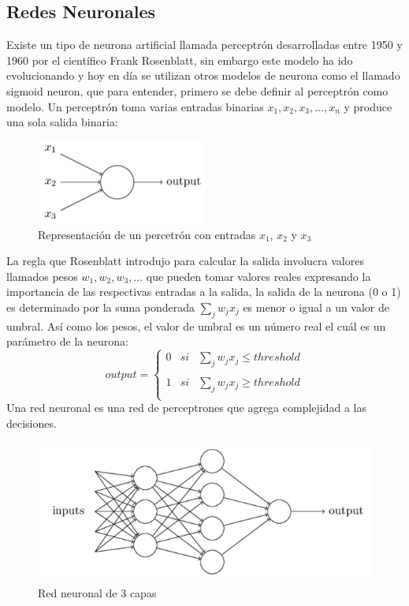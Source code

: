 \subsection{Redes Neuronales}
    Existe un tipo de neurona artificial llamada perceptrón desarrolladas entre 1950 y 1960 por el científico Frank Rosenblatt, sin embargo este modelo ha ido evolucionando y hoy en día se utilizan otros modelos de neurona como el llamado sigmoid neuron, que para entender, primero se debe definir al perceptrón como modelo.
    Un perceptrón toma varias entradas binarias $x_{1},x_{2},x_{3},...,x_{n}$ y produce una sola salida binaria:
     \begin{figure}[H]
        \centering
        \includegraphics[width=0.5\textwidth]{capitulo2/images/perceptron.PNG}
        \caption{Representación de un percetrón con entradas $x_{1}$, $x_{2}$ y $x_{3}$}
        \label{fig:perceptron}
    \end{figure}
    La regla que Rosenblatt introdujo para calcular la salida involucra valores llamados pesos $w_{1},w_{2},w_{3},...$ que pueden tomar valores reales expresando la importancia de las respectivas entradas a la salida, la salida de la neurona (0 o 1) es determinado por la suma ponderada $\sum_{j} w_{j} x_{j}$ es menor o igual a un valor de umbral. Así como los pesos, el valor de umbral es un número real el cuál es un parámetro de la neurona:
     \begin{equation}
        output = \left\{ \begin{array}{lcc}
             0 &   si  & \sum_{j} w_{j} x_{j} \leq threshold \\
             \\ 1 &  si & \sum_{j} w_{j} x_{j} \ge threshold\\
             \end{array}
        \right.
    \end{equation}
    \newpage
    Una red neuronal es una red de perceptrones que agrega complejidad a las decisiones.
    \begin{figure}[H]
        \centering
        \includegraphics[width=1\textwidth]{capitulo2/images/NNmodel.PNG}
        \caption{Red neuronal de 3 capas}
        \label{fig:NNmodel}
    \end{figure}
